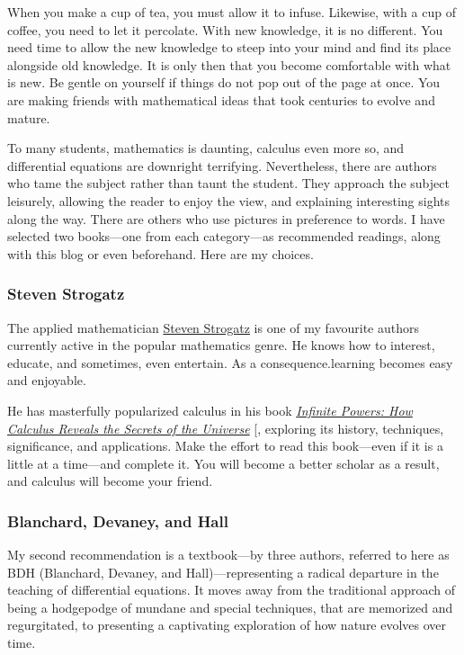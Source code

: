 \documentclass[
  a4paper,
]{article}
\begin{document}
When you make a cup of tea, you must allow it to infuse. Likewise, with
a cup of coffee, you need to let it percolate. With new knowledge, it is
no different. You need time to allow the new knowledge to steep into
your mind and find its place alongside old knowledge. It is only then
that you become comfortable with what is new. Be gentle on yourself if
things do not pop out of the page at once. You are making friends with
mathematical ideas that took centuries to evolve and mature.

To many students, mathematics is daunting, calculus even more so, and
differential equations are downright terrifying. Nevertheless, there are
authors who tame the subject rather than taunt the student. They
approach the subject leisurely, allowing the reader to enjoy the view,
and explaining interesting sights along the way. There are others who
use pictures in preference to words. I have selected two books---one
from each category---as recommended readings, along with this blog or
even beforehand. Here are my choices.

\subsubsection{Steven Strogatz}\label{steven-strogatz}

The applied mathematician
\href{https://en.wikipedia.org/wiki/Steven_Strogatz}{Steven Strogatz} is
one of my favourite authors currently active in the popular mathematics
genre. He knows how to interest, educate, and sometimes, even entertain.
As a consequence.learning becomes easy and enjoyable.

He has masterfully popularized calculus in his book
\href{https://www.stevenstrogatz.com/books/infinite-powers}{\emph{Infinite
Powers: How Calculus Reveals the Secrets of the Universe}}
{[}\citeproc{ref-strogatz-2019}{1}{]}, exploring its history,
techniques, significance, and applications. Make the effort to read this
book---even if it is a little at a time---and complete it. You will
become a better scholar as a result, and calculus will become your
friend.

\subsubsection{Blanchard, Devaney, and
Hall}\label{blanchard-devaney-and-hall}

My second recommendation is a textbook---by three authors, referred to
here as BDH (Blanchard, Devaney, and Hall)---representing a radical
departure in the teaching of differential equations. It moves away from
the traditional approach of being a hodgepodge of mundane and special
techniques, that are memorized and regurgitated, to presenting a
captivating exploration of how nature evolves over time.
\end{document}
